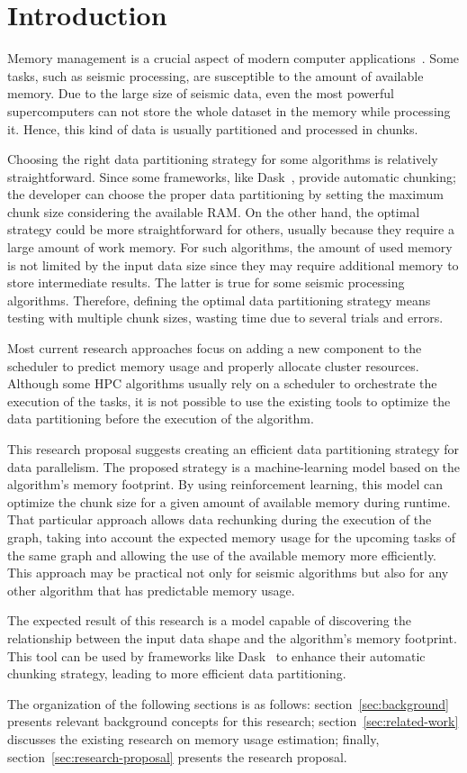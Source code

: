 \section{Introduction}
\label{sec:introduction}

Memory management is a crucial aspect of modern computer applications~\cite{pupykina2019}.
Some tasks, such as seismic processing, are susceptible to the amount of available memory.
Due to the large size of seismic data, even the most powerful supercomputers can not store the whole dataset in the memory while processing it.
Hence, this kind of data is usually partitioned and processed in chunks.

Choosing the right data partitioning strategy for some algorithms is relatively straightforward.
Since some frameworks, like Dask~\cite{dask}, provide automatic chunking; the developer can choose the proper data partitioning by setting the maximum chunk size considering the available \ac{RAM}.
On the other hand, the optimal strategy could be more straightforward for others, usually because they require a large amount of work memory.
For such algorithms, the amount of used memory is not limited by the input data size since they may require additional memory to store intermediate results.
The latter is true for some seismic processing algorithms.
Therefore, defining the optimal data partitioning strategy means testing with multiple chunk sizes, wasting time due to several trials and errors.

Most current research approaches focus on adding a new component to the scheduler to predict memory usage and properly allocate cluster resources.
Although some \ac{HPC} algorithms usually rely on a scheduler to orchestrate the execution of the tasks, it is not possible to use the existing tools to optimize the data partitioning before the execution of the algorithm.

This research proposal suggests creating an efficient data partitioning strategy for data parallelism.
The proposed strategy is a machine-learning model based on the algorithm's memory footprint.
By using reinforcement learning, this model can optimize the chunk size for a given amount of available memory during runtime.
That particular approach allows data rechunking during the execution of the graph, taking into account the expected memory usage for the upcoming tasks of the same graph and allowing the use of the available memory more efficiently.
This approach may be practical not only for seismic algorithms but also for any other algorithm that has predictable memory usage.

The expected result of this research is a model capable of discovering the relationship between the input data shape and the algorithm's memory footprint.
This tool can be used by frameworks like Dask~\cite{dask} to enhance their automatic chunking strategy, leading to more efficient data partitioning.

The organization of the following sections is as follows:
section~\ref{sec:background} presents relevant background concepts for this research;
section~\ref{sec:related-work} discusses the existing research on memory usage estimation;
finally, section~\ref{sec:research-proposal} presents the research proposal.